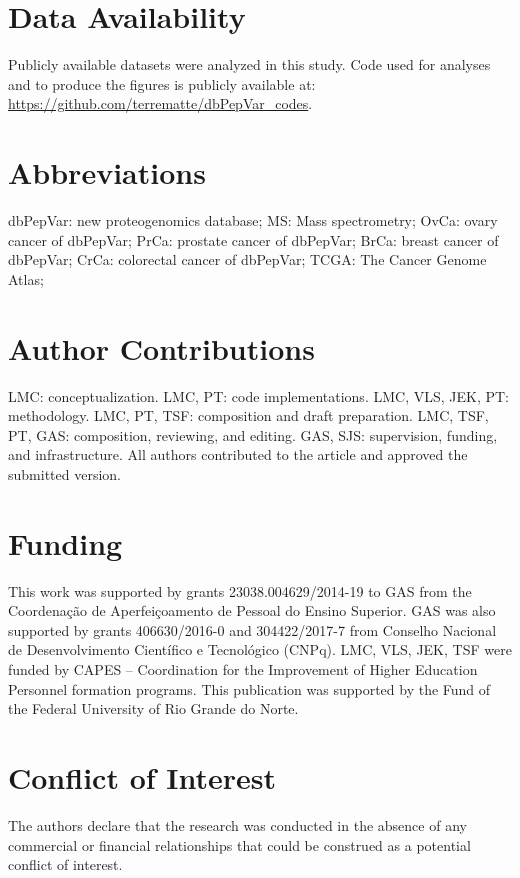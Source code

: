 \documentclass{ieeeaccess}
\begin{document}
\section{Data Availability}

Publicly available datasets were analyzed in this study. 
Code used for analyses and to produce the figures is publicly available at: \url{https://github.com/terrematte/dbPepVar_codes}. 

\section{Abbreviations}

dbPepVar: new proteogenomics database; MS: Mass spectrometry; OvCa: ovary cancer of dbPepVar; PrCa: prostate cancer of dbPepVar; BrCa: breast cancer of dbPepVar; CrCa: colorectal cancer of dbPepVar; TCGA: The Cancer Genome Atlas; 

\section{Author Contributions}

LMC: conceptualization. LMC, PT: code implementations. LMC, VLS, JEK, PT: methodology. LMC, PT, TSF: composition and draft preparation. LMC, TSF, PT, GAS: composition, reviewing, and editing. GAS, SJS: supervision, funding, and infrastructure. All authors contributed to the article and approved the submitted version.

\section{Funding}

This work was supported by grants 23038.004629/2014-19 to GAS from the Coordenação de Aperfeiçoamento de Pessoal do Ensino Superior. GAS was also supported by grants 406630/2016-0 and 304422/2017-7 from Conselho Nacional de Desenvolvimento Científico e Tecnológico (CNPq). LMC, VLS, JEK, TSF were funded by CAPES –  Coordination for the Improvement of Higher Education Personnel formation programs.  This publication was supported by the Fund of the Federal University of Rio Grande do Norte.

\section{Conflict of Interest}

The authors declare that the research was conducted in the absence of any commercial or financial relationships that could be construed as a potential conflict of interest.
\end{document}
